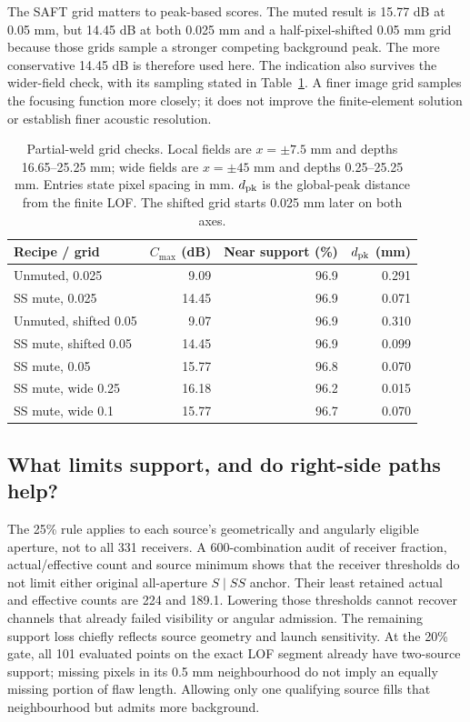 \documentclass[11pt]{article}
\begin{document}
The SAFT grid matters to peak-based scores. The muted result is 15.77 dB at 0.05 mm, but 14.45 dB at both 0.025 mm and a half-pixel-shifted 0.05 mm grid because those grids sample a stronger competing background peak. The more conservative 14.45 dB is therefore used here. The indication also survives the wider-field check, with its sampling stated in Table~\ref{saft:review_grid}. A finer image grid samples the focusing function more closely; it does not improve the finite-element solution or establish finer acoustic resolution.

\begin{table}[!htbp]\centering\small
\caption{Partial-weld grid checks. Local fields are $x=\pm7.5$ mm and depths 16.65--25.25 mm; wide fields are $x=\pm45$ mm and depths 0.25--25.25 mm. Entries state pixel spacing in mm. $d_{\rm pk}$ is the global-peak distance from the finite LOF. The shifted grid starts 0.025 mm later on both axes.}
\label{saft:review_grid}
\begin{tabular}{@{}lrrr@{}}\toprule
Recipe / grid & $C_{\max}$ (dB) & Near support (\%) & $d_{\rm pk}$ (mm)\\\midrule
Unmuted, 0.025 & 9.09 & 96.9 & 0.291\\
SS mute, 0.025 & 14.45 & 96.9 & 0.071\\
Unmuted, shifted 0.05 & 9.07 & 96.9 & 0.310\\
SS mute, shifted 0.05 & 14.45 & 96.9 & 0.099\\
SS mute, 0.05 & 15.77 & 96.8 & 0.070\\
SS mute, wide 0.25 & 16.18 & 96.2 & 0.015\\
SS mute, wide 0.1 & 15.77 & 96.7 & 0.070\\
\bottomrule\end{tabular}\end{table}

\subsection{What limits support, and do right-side paths help?}
The 25\% rule applies to each source's geometrically and angularly eligible aperture, not to all 331 receivers. A 600-combination audit of receiver fraction, actual/effective count and source minimum shows that the receiver thresholds do not limit either original all-aperture $S\mid SS$ anchor. Their least retained actual and effective counts are 224 and 189.1. Lowering those thresholds cannot recover channels that already failed visibility or angular admission. The remaining support loss chiefly reflects source geometry and launch sensitivity. At the 20\% gate, all 101 evaluated points on the exact LOF segment already have two-source support; missing pixels in its 0.5 mm neighbourhood do not imply an equally missing portion of flaw length. Allowing only one qualifying source fills that neighbourhood but admits more background.
\end{document}

